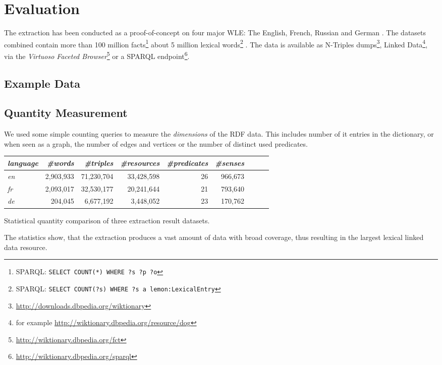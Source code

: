 \section{Evaluation}
\label{sec:evaluation}
The extraction has been conducted as a proof-of-concept on four major WLE:
The English, French, Russian and German \wik.
The datasets combined contain more than 100 million facts\footnote{SPARQL: \texttt{SELECT COUNT(*) WHERE {?s ?p ?o}}} about 5 million lexical words\footnote{SPARQL: \texttt{SELECT COUNT(?s) WHERE {?s a lemon:LexicalEntry}}} .
The data is available as N-Triples dumps\footnote{\url{http://downloads.dbpedia.org/wiktionary}}, Linked Data\footnote{for example \url{http://wiktionary.dbpedia.org/resource/dog}}, via the \emph{Virtuoso Faceted Browser}\footnote{\url{http://wiktionary.dbpedia.org/fct}} or a SPARQL endpoint\footnote{\url{http://wiktionary.dbpedia.org/sparql}}.

\subsection{Example Data}


\subsection{Quantity Measurement}
We used some simple counting queries to measure the \textit{dimensions} of the RDF data. This includes number of it entries in the dictionary, or when seen as a graph, the number of edges and vertices or the number of distinct used predicates. 

\begin{threeparttable} 
\begin{tabular}{|l|r|r|r|r|r|r|r|r|}
\hline \emph{language} & \emph{\#words} & \emph{\#triples} & \emph{\#resources}  & \emph{\#predicates} & \emph{\#senses} \\ 
\hline \hline \textit{en} & 2,903,933 & 71,230,704 & 33,428,598 & 26 & 966,673 \\ 
\hline \textit{fr} & 2,093,017 & 32,530,177 & 20,241,644 & 21 & 793,640 \\ 
\hline \textit{de} & 204,045 & 6,677,192 & 3,448,052 & 23 & 170,762 \\ 
\hline 
\end{tabular}
\caption{Statistical quantity comparison of three \wik extraction result datasets.}
\end{threeparttable}

The statistics show, that the extraction produces a vast amount of data with broad coverage, thus resulting in the largest lexical linked data resource. 


